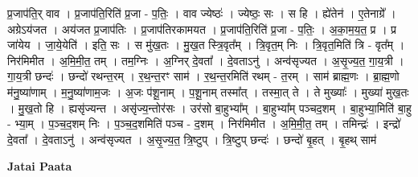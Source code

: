 \documentclass[17pt]{extarticle}
\begin{document}
प्र॒जाप॑ति॒र् वाव । प्र॒जाप॑ति॒रिति॑ प्र॒जा - प॒तिः॒ । वाव ज्येष्ठः॑ । ज्येष्ठः॒ सः । स हि । ह्ये॑तेन॑ । ए॒तेनाग्रे᳚ । अग्रेऽय॑जत । अय॑जत प्र॒जाप॑तिः । प्र॒जाप॑तिरकामयत । प्र॒जाप॑ति॒रिति॑ प्र॒जा - प॒तिः॒ । अ॒का॒म॒य॒त॒ प्र । प्र जा॑येय । जा॒ये॒येति॑ । इति॒ सः । स मु॑ख॒तः । मु॒ख॒त स्त्रि॒वृत᳚म् । त्रि॒वृत॒म् निः । त्रि॒वृत॒मिति॑ त्रि - वृत᳚म् । निर॑मिमीत । अ॒मि॒मी॒त॒ तम् । तम॒ग्निः । अ॒ग्निर् दे॒वता᳚ । दे॒वताऽनु॑ । अन्व॑सृज्यत । अ॒सृ॒ज्य॒त॒ गा॒य॒त्री । गा॒य॒त्री छन्दः॑ । छन्दो॑ रथन्त॒रम् । र॒थ॒न्त॒रꣳ साम॑ । र॒थ॒न्त॒रमिति॑ रथम् - त॒रम् । साम॑ ब्राह्म॒णः । ब्रा॒ह्म॒णो म॑नु॒ष्या॑णाम् । म॒नु॒ष्या॑णाम॒जः । अ॒जः प॑शू॒नाम् । प॒शू॒नाम् तस्मा᳚त् । तस्मा॒त् ते । ते मुख्याः᳚ । मुख्या॑ मुख॒तः । मु॒ख॒तो हि । ह्यसृ॑ज्यन्त । असृ॑ज्य॒न्तोर॑सः । उर॑सो बा॒हुभ्या᳚म् । बा॒हुभ्या᳚म् पञ्चद॒शम् । बा॒हुभ्या॒मिति॑ बा॒हु - भ्या॒म् । प॒ञ्च॒द॒शम् निः । प॒ञ्च॒द॒शमिति॑ पञ्च - द॒शम् । निर॑मिमीत । अ॒मि॒मी॒त॒ तम् । तमिन्द्रः॑ । इन्द्रो॑ दे॒वता᳚ । दे॒वताऽनु॑ । अन्व॑सृज्यत । अ॒सृ॒ज्य॒त॒ त्रि॒ष्टुप् । त्रि॒ष्टुप् छन्दः॑ । छन्दो॑ बृ॒हत् । बृ॒हथ् साम॑ \newline

\textbf{Jatai Paata} \newline
\end{document}
